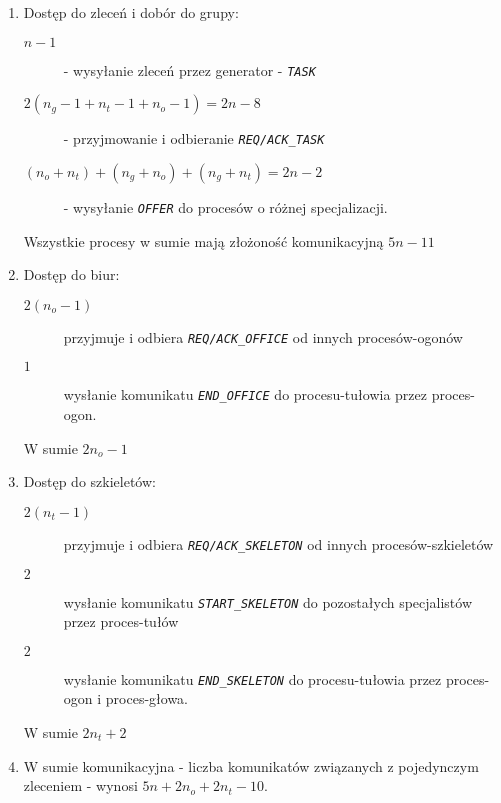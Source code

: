 \documentclass[12pt]{article}
\newcommand{\msg}[1]{\texttt{\emph{#1}}}
\begin{document}
\begin{enumerate}
	\item Dostęp do zleceń i dobór do grupy:
	\begin{description}
		\item[\(n-1\)] - wysyłanie zleceń przez generator - \msg{TASK}
		\item[\(2(n_g-1+n_t-1+n_o-1)=2n-8\)] - przyjmowanie  i odbieranie \msg{REQ/ACK\_TASK}
		\item[\((n_o+n_t)+(n_g+n_o)+(n_g+n_t)=2n-2\)] - wysyłanie \msg{OFFER} do procesów o różnej specjalizacji.
	\end{description} 
	Wszystkie procesy w sumie mają złożoność komunikacyjną \(5n-11\)
	
	
	\item Dostęp do biur:
	\begin{description}
		\item[\(2(n_o-1)\)] przyjmuje i odbiera \msg{REQ/ACK\_OFFICE} od innych procesów-ogonów
		\item[\(1\)] wysłanie komunikatu \msg{END\_OFFICE} do procesu-tułowia przez proces-ogon.
	\end{description} 
	W sumie \(2n_o-1\)
	\item Dostęp do szkieletów:
	\begin{description}
		\item[\(2(n_t-1)\)] przyjmuje i odbiera \msg{REQ/ACK\_SKELETON} od innych procesów-szkieletów
		\item[\(2\)] wysłanie komunikatu \msg{START\_SKELETON} do pozostałych specjalistów przez proces-tułów
		\item[\(2\)] wysłanie komunikatu \msg{END\_SKELETON} do procesu-tułowia przez proces-ogon i proces-głowa.
	\end{description}
	W sumie \(2n_t+2\)
	\item W sumie komunikacyjna - liczba komunikatów związanych z pojedynczym zleceniem - wynosi \(5n+2n_o+2n_t-10\).
\end{enumerate}
\end{document}
